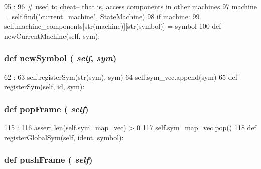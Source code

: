 \begin{DoxyCode}
95                                          :
96         # used to cheat-- that is, access components in other machines
97         machine = self.find("current_machine", StateMachine)
98         if machine:
99             self.machine_components[str(machine)][str(symbol)] = symbol
100 
    def newCurrentMachine(self, sym):
\end{DoxyCode}
\hypertarget{classslicc_1_1symbols_1_1SymbolTable_1_1SymbolTable_a256b30ec3ed95726130ecbcfe94ab26a}{
\subsubsection[{newSymbol}]{\setlength{\rightskip}{0pt plus 5cm}def newSymbol ( {\em self}, \/   {\em sym})}}
\label{classslicc_1_1symbols_1_1SymbolTable_1_1SymbolTable_a256b30ec3ed95726130ecbcfe94ab26a}



\begin{DoxyCode}
62                             :
63         self.registerSym(str(sym), sym)
64         self.sym_vec.append(sym)
65 
    def registerSym(self, id, sym):
\end{DoxyCode}
\hypertarget{classslicc_1_1symbols_1_1SymbolTable_1_1SymbolTable_a9483e85950d1ea03dfc063962c08a1b9}{
\subsubsection[{popFrame}]{\setlength{\rightskip}{0pt plus 5cm}def popFrame ( {\em self})}}
\label{classslicc_1_1symbols_1_1SymbolTable_1_1SymbolTable_a9483e85950d1ea03dfc063962c08a1b9}



\begin{DoxyCode}
115                       :
116         assert len(self.sym_map_vec) > 0
117         self.sym_map_vec.pop()
118 
    def registerGlobalSym(self, ident, symbol):
\end{DoxyCode}
\hypertarget{classslicc_1_1symbols_1_1SymbolTable_1_1SymbolTable_a7dfb59f66a6fd28386285ed4c3d94e08}{
\subsubsection[{pushFrame}]{\setlength{\rightskip}{0pt plus 5cm}def pushFrame ( {\em self})}}
\label{classslicc_1_1symbols_1_1SymbolTable_1_1SymbolTable_a7dfb59f66a6fd28386285ed4c3d94e08}



